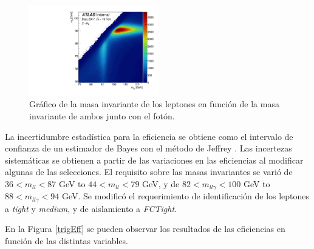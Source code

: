 \begin{figure}
\centering
	\caption{Gráfico de la masa invariante de los leptones en función de la masa invariante de ambos junto con el fotón.  \commentNotaIII }

  \includegraphics[width=0.5\textwidth]{images/h_mllg_mll.pdf}

  \label{mllgmll}
\end{figure}

La incertidumbre estadística para la eficiencia se obtiene como el intervalo de confianza de un estimador de Bayes con el método de Jeffrey \cite{jeffrey} . Las incertezas sistemáticas se obtienen a partir de las variaciones en las eficiencias al modificar algunas de las selecciones. El requisito sobre las masas invariantes se varió de $36<m_{ll}<87$ GeV to $44<m_{ll}<79$ GeV, y de 
$82<m_{ll\gamma}<100$ GeV to $88<m_{ll\gamma}<94$ GeV. Se modificó el requerimiento de identificación de los leptones a \textit{tight} y \textit{medium}, y de aislamiento a \textit{FCTight}.

En la Figura \ref{trigEff} se pueden observar los resultados de las eficiencias en función de las distintas variables.  




